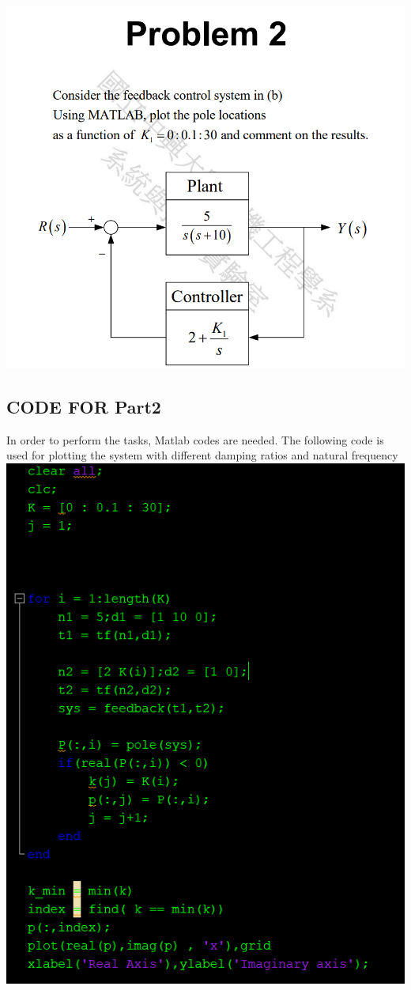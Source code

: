 \documentclass[12pt]{article}
\begin{document}
\includegraphics[scale=0.8]{Problem2.png}   \\

\cleardoublepage
\subsection{CODE FOR Part2}
In order to perform the tasks, Matlab codes are needed. The following code is used for plotting the system with different damping ratios and natural frequency \\

\includegraphics[scale=0.8]{Code2.png} \\
\end{document}
